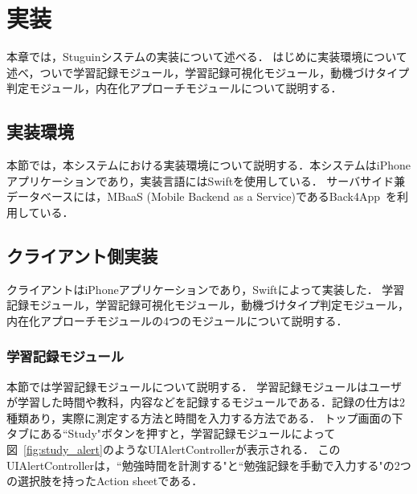 \chapter{実装}
本章では，Stuguinシステムの実装について述べる．
はじめに実装環境について述べ，ついで学習記録モジュール，学習記録可視化モジュール，動機づけタイプ判定モジュール，内在化アプローチモジュールについて説明する．

\section{実装環境}
本節では，本システムにおける実装環境について説明する．本システムはiPhoneアプリケーションであり，実装言語にはSwiftを使用している．
サーバサイド兼データベースには，MBaaS (Mobile Backend as a Service)であるBack4App~\cite{back4app}を利用している．

\section{クライアント側実装}
クライアントはiPhoneアプリケーションであり，Swiftによって実装した．
学習記録モジュール，学習記録可視化モジュール，動機づけタイプ判定モジュール，内在化アプローチモジュールの4つのモジュールについて説明する．

\subsection{学習記録モジュール}
本節では学習記録モジュールについて説明する．
学習記録モジュールはユーザが学習した時間や教科，内容などを記録するモジュールである．記録の仕方は2種類あり，実際に測定する方法と時間を入力する方法である．
トップ画面の下タブにある``Study"ボタンを押すと，学習記録モジュールによって図~\ref{fig:study_alert}のようなUIAlertControllerが表示される．
このUIAlertControllerは，``勉強時間を計測する"と``勉強記録を手動で入力する"の2つの選択肢を持ったAction sheetである．

